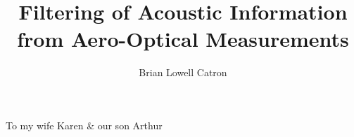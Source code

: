 \documentclass[twoadvisors,noinfo]{nddiss2e}
\begin{document}
  \frontmatter
    \title{ Filtering of Acoustic Information from Aero-Optical Measurements }
    \author{ Brian Lowell Catron }

    \maketitle
    \makecopyright

    \begin{abstract}
      
    \end{abstract}
    \begin{dedication}
      To my wife Karen \& our son Arthur
    \end{dedication}

    \tableofcontents
    \listoffigures
    \listoftables
    

    \begin{acknowledge}
      
    \end{acknowledge}

  \mainmatter
    
    
    
    
    
    
    
    


  \backmatter
    
    
\end{document}
